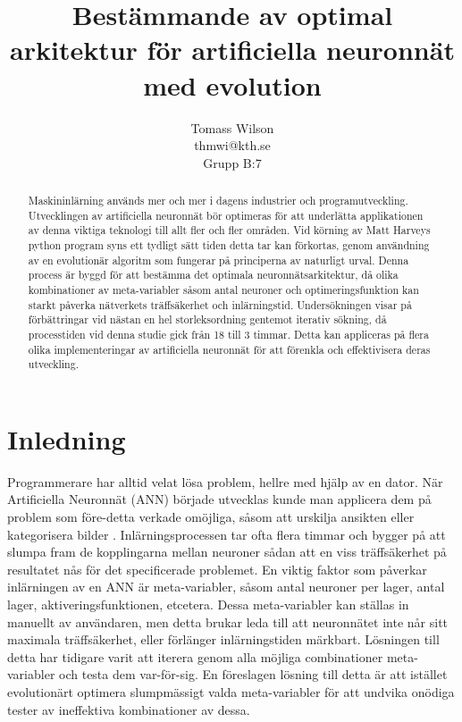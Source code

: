 \documentclass[a4paper, 12pt]{article}
\title{Bestämmande av optimal arkitektur för artificiella neuronnät med evolution}
\author{Tomass Wilson\\thmwi@kth.se\\Grupp B:7}
\begin{document}

  \maketitle

  \begin{abstract}
    Maskininlärning används mer och mer i dagens industrier och programutveckling. Utvecklingen av artificiella neuronnät bör optimeras för att underlätta applikationen av denna viktiga teknologi till allt fler och fler områden. Vid körning av Matt Harveys python program syns ett tydligt sätt tiden detta tar kan förkortas, genom användning av en evolutionär algoritm som fungerar på principerna av naturligt urval. Denna process är byggd för att bestämma det optimala neuronnätsarkitektur, då olika kombinationer av meta-variabler såsom antal neuroner och optimeringsfunktion kan starkt påverka nätverkets träffsäkerhet och inlärningstid. Undersökningen visar på förbättringar vid nästan en hel storleksordning gentemot iterativ sökning, då processtiden vid denna studie gick från 18 till 3 timmar. Detta kan appliceras på flera olika implementeringar av artificiella neuronnät för att förenkla och effektivisera deras utveckling.
  \end{abstract}

  \newpage


  \tableofcontents

  \newpage


  \section{Inledning}
    Programmerare har alltid velat lösa problem, hellre med hjälp av en dator. När Artificiella Neuronnät (ANN) började utvecklas kunde man applicera dem på problem som före-detta verkade omöjliga, såsom att urskilja ansikten eller kategorisera bilder \parencite{hopfield1988artificial}. Inlärningsprocessen tar ofta flera timmar och bygger på att slumpa fram de kopplingarna mellan neuroner sådan att en viss träffsäkerhet på resultatet nås för det specificerade problemet. En viktig faktor som påverkar inlärningen av en ANN är meta-variabler, såsom antal neuroner per lager, antal lager, aktiveringsfunktionen, etcetera. Dessa meta-variabler kan ställas in manuellt av användaren, men detta brukar leda till att neuronnätet inte når sitt maximala träffsäkerhet, eller förlänger inlärningstiden märkbart. Lösningen till detta har tidigare varit att iterera genom alla möjliga combinationer meta-variabler och testa dem var-för-sig. En föreslagen lösning till detta är att istället evolutionärt optimera slumpmässigt valda meta-variabler för att undvika onödiga tester av ineffektiva kombinationer av dessa.
\end{document}
